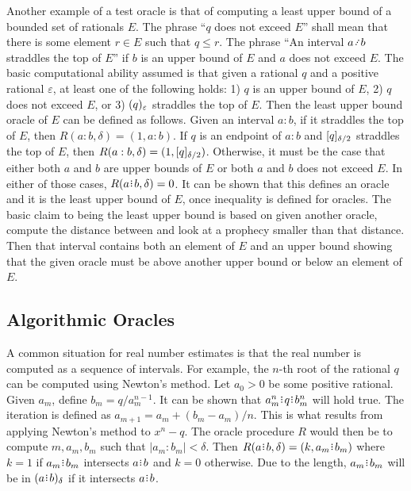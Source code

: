 \documentclass[12pt]{article}
\begin{document}
Another example of a test oracle is that of computing a least upper bound of a bounded set of rationals $E$. The phrase ``$q$ does not exceed $E$'' shall mean that there is some element $r \in E$ such that $q \leq r$. The phrase ``An interval $a \lte b$ straddles the top of $E$'' if $b$ is an upper bound of $E$ and $a$ does not exceed $E$. The basic computational ability assumed is that given a rational $q$ and a positive rational $\varepsilon$, at least one of the following holds: 1) $q$ is an upper bound of $E$, 2) $q$ does not exceed $E$, or 3)  $\halo[\varepsilon]{q}$ straddles the top of $E$. Then the least upper bound oracle of $E$ can be defined as follows. Given an interval $a : b$, if it straddles the top of $E$, then $R(a : b, \delta) = (1, a:b)$. If $q$ is an endpoint of $a:b$ and  $\clhalo[\delta/2]{q}$ straddles the top of $E$, then $R(a:b, \delta)= (1, \clhalo[\delta/2]{q})$. Otherwise, it must be the case that either both $a$ and $b$ are upper bounds of $E$ or both $a$ and $b$ does not exceed $E$. In either of those cases, $R(a \rint b, \delta) = 0$. It can be shown that this defines an oracle and it is the least upper bound of $E$, once inequality is defined for oracles. The basic claim to being the least upper bound is based on given another oracle, compute the distance between and look at a prophecy smaller than that distance. Then that interval contains both an element of $E$ and an upper bound showing that the given oracle must be above another upper bound or below an element of $E$.




\subsection{Algorithmic Oracles}


A common situation for real number estimates is that the real number is computed as a sequence of intervals. For example, the $n$-th root of the rational $q$ can be computed using Newton's method. Let $a_0 >0$ be some positive rational. Given $a_m$, define $b_m = q/a_m^{n-1}$. It can be shown that $a_m^n \rint  q \rint  b_m^n$ will hold true. The iteration is defined as $a_{m+1} = a_m + (b_m - a_m)/n$. This is what results from applying Newton's method to $x^n - q$. The oracle procedure $R$ would then be to compute $m, a_m, b_m$ such that $|a_m : b_m| < \delta$.  Then $R(a\rint b, \delta) = (k, a_m\rint b_m)$ where $k=1$ if $a_m\rint b_m$ intersects $a\rint b$ and $k =0$ otherwise. Due to the length, $a_m\rint b_m$ will be in $\halo{a\rint b}$ if it intersects $a\rint b$. 
\end{document}
